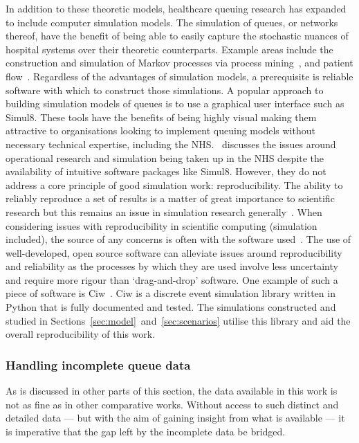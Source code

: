 \documentclass[11pt]{article}
\begin{document}
In addition to these theoretic models, healthcare queuing research has expanded
to include computer simulation models. The simulation of queues, or networks
thereof, have the benefit of being able to easily capture the stochastic nuances
of hospital systems over their theoretic counterparts. Example areas include the
construction and simulation of Markov processes via process
mining~\cite{Arnolds2018,Rebuge2012}, and patient flow~\cite{Bhattacharjee2014}.
Regardless of the advantages of simulation models, a prerequisite is reliable
software with which to construct those simulations. A popular approach to
building simulation models of queues is to use a graphical user interface such
as Simul8. These tools have the benefits of being highly visual making them
attractive to organisations looking to implement queuing models without
necessary technical expertise, including the NHS.~\cite{Brailsford2013}
discusses the issues around operational research and simulation being taken up
in the NHS despite the availability of intuitive software packages like Simul8.
However, they do not address a core principle of good simulation work:
reproducibility. The ability to reliably reproduce a set of results is a matter
of great importance to scientific research but this remains an issue in
simulation research generally~\cite{Fitzpatrick2019}. When considering issues
with reproducibility in scientific computing (simulation included), the source
of any concerns is often with the software used~\cite{Ivie2018}. The use of
well-developed, open source software can alleviate issues around reproducibility
and reliability as the processes by which they are used involve less uncertainty
and require more rigour than `drag-and-drop' software. One example of such a
piece of software is Ciw~\cite{Palmer2019}. Ciw is a discrete event simulation
library written in Python that is fully documented and tested. The simulations
constructed and studied in Sections~\ref{sec:model}~and~\ref{sec:scenarios}
utilise this library and aid the overall reproducibility of this work.

\subsubsection{Handling incomplete queue data}

As is discussed in other parts of this section, the data available in this work
is not as fine as in other comparative works. Without access to such distinct
and detailed data --- but with the aim of gaining insight from what is available
--- it is imperative that the gap left by the incomplete data be bridged.
\end{document}
